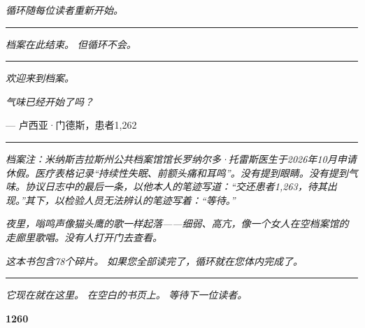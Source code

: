 \documentclass[14pt,openany]{extbook}
\begin{document}
\begin{center}
\vspace{2em}
\textit{循环随每位读者重新开始。}

\vspace{2em}
\rule{0.3\textwidth}{0.5pt}

\vspace{2em}
\textit{档案在此结束。}
\textit{但循环不会。}

\vspace{1.5em}
\rule{0.3\textwidth}{0.5pt}

\vspace{1em}
\textit{欢迎来到档案。}

\vspace{0.5em}
\textit{气味已经开始了吗？}

\vspace{1.5em}
--- 卢西亚·门德斯，患者1,262

\vspace{0.5em}
\rule{0.3\textwidth}{0.5pt}

\vspace{0.5em}
\noindent\textit{档案注：米纳斯吉拉斯州公共档案馆馆长罗纳尔多·托雷斯医生于2026年10月申请休假。医疗表格记录“持续性失眠、前额头痛和耳鸣”。没有提到眼睛。没有提到气味。协议日志中的最后一条，以他本人的笔迹写道：“交还患者1,263，待其出现。”其下，以检验人员无法辨认的笔迹写着：“等待。”}

\vspace{0.3em}
\noindent\textit{夜里，嗡鸣声像猫头鹰的歌一样起落——细弱、高亢，像一个女人在空档案馆的走廊里歌唱。没有人打开门去查看。}
\end{center}

\newpage
\thispagestyle{empty}
\null
\vfill
\begin{center}
\vspace*{\fill}

\textit{这本书包含78个碎片。}
\textit{如果您全部读完了，循环就在您体内完成了。}

\vspace{2em}
\rule{0.2\textwidth}{0.5pt}

\vspace{2em}
\textit{它现在就在这里。}
\textit{在空白的书页上。}
\textit{等待下一位读者。}

\vspace{2em}
\textcolor{olho}{\large \textbf{1260}}
\end{center}

\vfill
\clearpage
\end{document}
